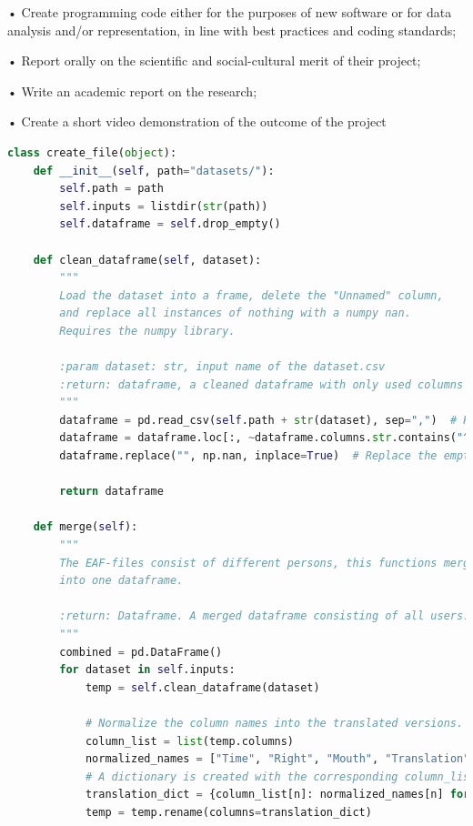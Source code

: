 • Create programming code either for the purposes of new software or for data analysis and/or representation, in line with best practices and coding standards;

• Report orally on the scientific and social-cultural merit of their project;

• Write an academic report on the research;

• Create a short video demonstration of the outcome of the project





 \label{apx:first}
\begin{lstlisting}[language=Python, caption=Shown is the Python code to merge the multiple CSV-files into one DataFrame.]
class create_file(object):
    def __init__(self, path="datasets/"):
        self.path = path
        self.inputs = listdir(str(path))
        self.dataframe = self.drop_empty()

    def clean_dataframe(self, dataset):
        """
        Load the dataset into a frame, delete the "Unnamed" column,
        and replace all instances of nothing with a numpy nan.
        Requires the numpy library.

        :param dataset: str, input name of the dataset.csv
        :return: dataframe, a cleaned dataframe with only used columns
        """
        dataframe = pd.read_csv(self.path + str(dataset), sep=",")  # Read into a frame
        dataframe = dataframe.loc[:, ~dataframe.columns.str.contains("^Unnamed")]  # Drop the "^Unnamed" column
        dataframe.replace("", np.nan, inplace=True)  # Replace the empty values with a nan

        return dataframe

    def merge(self):
        """
        The EAF-files consist of different persons, this functions merges those
        into one dataframe.

        :return: Dataframe. A merged dataframe consisting of all users.
        """
        combined = pd.DataFrame()
        for dataset in self.inputs:
            temp = self.clean_dataframe(dataset)

            # Normalize the column names into the translated versions.
            column_list = list(temp.columns)
            normalized_names = ["Time", "Right", "Mouth", "Translation", "Left"]
            # A dictionary is created with the corresponding column_list name and the normalized name
            translation_dict = {column_list[n]: normalized_names[n] for n in range(len(normalized_names))}
            temp = temp.rename(columns=translation_dict)


\end{lstlisting}
